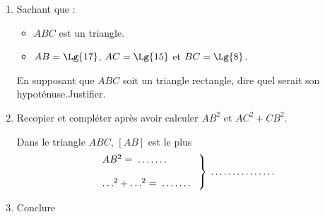 \begin{exercice*}
    \begin{enumerate}
        \item Sachant que :
        \begin{itemize}
            \item $ABC$ est un triangle.
            \item $AB=\Lg{17}$, $AC=\Lg{15}$ et $BC=\Lg{8}$.
        \end{itemize}
        En supposant que $ABC$ soit un triangle rectangle, dire quel serait son hypoténuse.Justifier.
        \item Recopier et compléter après avoir calculer $AB^2$ et $AC^2+CB^2$.
        
            Dans le triangle $ABC$, $[AB]$ est le plus \makebox[0.1\linewidth]{\dotfill}
            $$\left.\begin{array}{l}
            AB^2=\makebox[0.1\linewidth]{\dotfill}\\
            \\
            \ldots^2+\ldots^2=\makebox[0.1\linewidth]{\dotfill}\\
            \end{array}
            \right\rbrace \makebox[0.2\linewidth]{\dotfill}$$
        \item Conclure
    \end{enumerate}
\end{exercice*}
